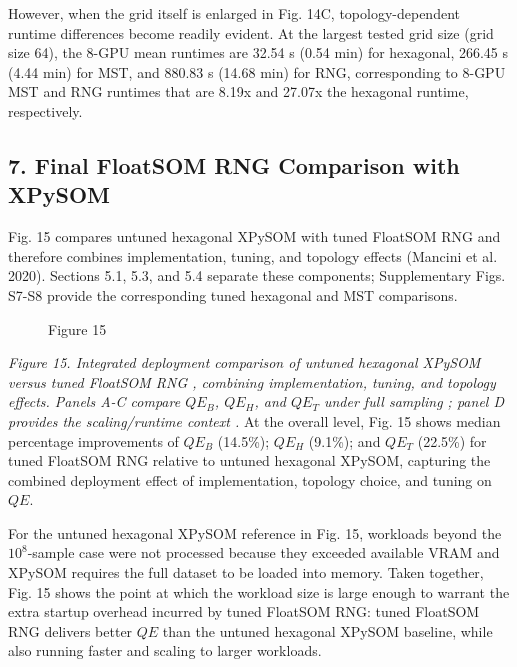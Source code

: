 \documentclass[
]{article}
\makeatletter
\newcommand*\pandocbounded[1]{%
  \sbox\pandoc@box{#1}%
  \Gscale@div\@tempa{\textheight}{\dimexpr\ht\pandoc@box+\dp\pandoc@box\relax}%
  \Gscale@div\@tempb{\linewidth}{\wd\pandoc@box}%
  \ifdim\@tempb\p@<\@tempa\p@\let\@tempa\@tempb\fi%
  \ifdim\@tempa\p@<\p@\scalebox{\@tempa}{\usebox\pandoc@box}%
  \else\usebox{\pandoc@box}%
  \fi%
}
\providecommand{\DIFadd}[1]{{\protect\color{blue} #1}} %
\providecommand{\DIFaddbegin}{} %
\providecommand{\DIFaddend}{} %
\providecommand{\DIFaddFL}[1]{\DIFadd{#1}} %
\providecommand{\DIFaddbeginFL}{} %
\providecommand{\DIFaddendFL}{} %
\makeatother
\begin{document}
However, when the grid itself is enlarged in Fig.  \DIFaddbegin \DIFadd{14C}\DIFaddend ,
topology-dependent runtime differences become readily evident. At the
largest tested grid size (grid size 64), the 8-GPU mean runtimes are
32.54 s (0.54 min) for hexagonal, 266.45 s (4.44 min) for MST, and
880.83 s (14.68 min) for RNG, corresponding to 8-GPU MST and RNG
runtimes that are 8.19x and 27.07x the hexagonal runtime, respectively.

\subsection{7. Final FloatSOM RNG Comparison with
XPySOM}\label{final-floatsom-rng-comparison-with-xpysom}

Fig.  \DIFaddbegin \DIFadd{15 compares untuned hexagonal XPySOM with tuned FloatSOM RNG and
therefore combines implementation, tuning, and topology effects }\DIFaddend (Mancini
et al. 2020). \DIFaddbegin \DIFadd{Sections 5.1, 5.3, and 5.4 separate these components;
Supplementary Figs. S7-S8 provide the corresponding tuned hexagonal and
MST comparisons.
}\DIFaddend

\begin{figure}
\centering
 \DIFaddbeginFL \pandocbounded{}
\DIFaddendFL \caption{Figure  \DIFaddbeginFL \DIFaddFL{15}\DIFaddendFL }
\end{figure}

\emph{Figure  \DIFaddbegin \DIFadd{15. }\DIFaddend Integrated deployment comparison of  \DIFaddbegin \DIFadd{untuned }\DIFaddend hexagonal
XPySOM versus tuned FloatSOM RNG\DIFaddbegin \DIFadd{, combining implementation, tuning, and
topology effects}\DIFaddend . Panels A-C compare \(QE_B\), \(QE_H\), and \(QE_T\)
 \DIFaddbegin \DIFadd{under }\DIFaddend full sampling \DIFaddbegin \DIFadd{; panel }\DIFaddend D provides the scaling/runtime context .} At
the overall level, Fig.  \DIFaddbegin \DIFadd{15 }\DIFaddend shows median percentage improvements of
\(QE_B\) (14.5\%); \(QE_H\) (9.1\%); and \(QE_T\) (22.5\%) for tuned
FloatSOM RNG relative to  \DIFaddbegin \DIFadd{untuned }\DIFaddend hexagonal XPySOM, capturing the
combined deployment effect of  \DIFaddbegin \DIFadd{implementation, topology choice, }\DIFaddend and
tuning on \(QE\).

For the  \DIFaddbegin \DIFadd{untuned }\DIFaddend hexagonal XPySOM reference in Fig.  \DIFaddbegin \DIFadd{15}\DIFaddend , workloads beyond
the \(10^8\)-sample case were not processed because they exceeded
available VRAM and XPySOM requires the full dataset to be loaded into
memory. Taken together, Fig.  \DIFaddbegin \DIFadd{15 }\DIFaddend shows the point at which the workload
size is large enough to warrant the extra startup overhead incurred by
tuned FloatSOM RNG: tuned FloatSOM RNG delivers better \(QE\) than the
 \DIFaddbegin \DIFadd{untuned }\DIFaddend hexagonal XPySOM baseline, while also running faster and scaling
to larger workloads.
\end{document}
